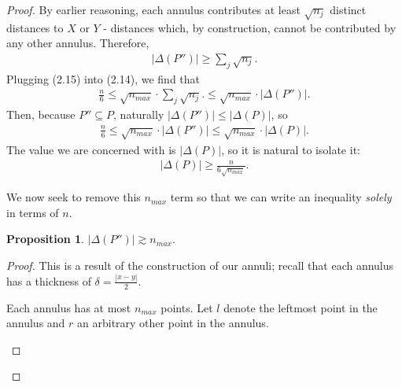 \documentclass{scrippsthesisclass}
\theoremstyle{definition}
\newtheorem{proposition}[theorem]{Proposition}
\begin{document}
\begin{proof}
    By earlier reasoning, each annulus contributes at least $\sqrt{n_j}$ distinct distances to $X$ or $Y$ - distances which, by construction, cannot be contributed by any other annulus. 
    Therefore, 
    \begin{align}
    \left|\Delta (P'')\right| \geq \sum_j {\sqrt{n_j}}. 
    \end{align}
    Plugging (2.15) into (2.14), we find that 
    \begin{align}
    \frac{n}{6} \leq \sqrt{n_{max}} \cdot \sum_j \sqrt{n_j}. \leq \sqrt{n_{max}} \cdot \left|\Delta (P'')\right|.
    \end{align}
    Then, because $P'' \subseteq P$, naturally $\left|\Delta(P'')\right| \leq \left|\Delta(P)\right|$, so 
    \begin{align}
        \frac{n}{6} \leq \sqrt{n_{max}} \cdot \left|\Delta (P'')\right| \leq \sqrt{n_{max}} \cdot \left|\Delta (P)\right|.
    \end{align}
    The value we are concerned with is $\left|\Delta (P)\right|$, so it is natural to isolate it:
    \begin{align}
    \left|\Delta (P)\right| \geq \frac{n}{6\sqrt{n_{max}}}.
    \end{align}

    We now seek to remove this $n_{max}$ term so that we can write an inequality \textit{solely} in terms of $n$. 
    \begin{proposition}
        $\left| \Delta(P'')\right| \gtrsim n_{max}$.
    \end{proposition}
    \begin{proof}
    This is a result of the construction of our annuli; recall that each annulus has a thickness of $\delta = \frac{|x - y|}{2}$. 

    Each annulus has at most $n_{max}$ points. 
    Let $l$ denote the leftmost point in the annulus and $r$ an arbitrary other point in the annulus.

\begin{center}
\end{center}


\end{proof}
\end{proof}
\end{document}
